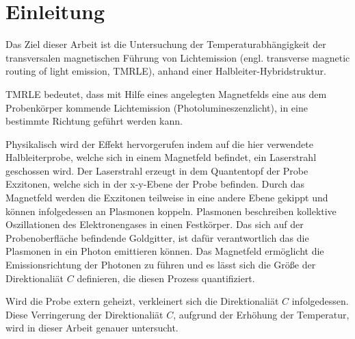 \chapter{Einleitung}
Das Ziel dieser Arbeit ist die Untersuchung der Temperaturabhängigkeit
der transversalen magnetischen Führung von Lichtemission (engl.
transverse magnetic routing of light emission, TMRLE), anhand einer Halbleiter-Hybridstruktur.

TMRLE bedeutet, dass mit Hilfe eines angelegten Magnetfelds eine aus dem 
Probenkörper kommende Lichtemission (Photolumineszenzlicht), in
eine bestimmte Richtung geführt werden kann.

Physikalisch wird der Effekt hervorgerufen indem auf die hier verwendete 
Halbleiterprobe, welche sich in einem Magnetfeld befindet, ein Laserstrahl geschossen wird.
Der Laserstrahl erzeugt in dem Quantentopf der Probe Exzitonen, welche sich in der x-y-Ebene der
Probe befinden. Durch das Magnetfeld werden die Exzitonen teilweise in eine andere Ebene gekippt und
können infolgedessen an Plasmonen koppeln.
Plasmonen beschreiben kollektive Oszillationen des Elektronengases in einen Festkörper. 
Das sich auf der Probenoberfläche befindende Goldgitter, ist dafür verantwortlich 
das die Plasmonen in ein Photon emittieren können.
Das Magnetfeld ermöglicht die Emissionsrichtung der Photonen 
zu führen und es lässt sich die Größe der
Direktionaliät $C$ definieren, die diesen Prozess quantifiziert.

Wird die Probe extern geheizt, verkleinert sich die Direktionaliät $C$ infolgedessen. 
Diese Verringerung der Direktionaliät $C$, aufgrund der Erhöhung der Temperatur, wird in dieser Arbeit genauer untersucht.